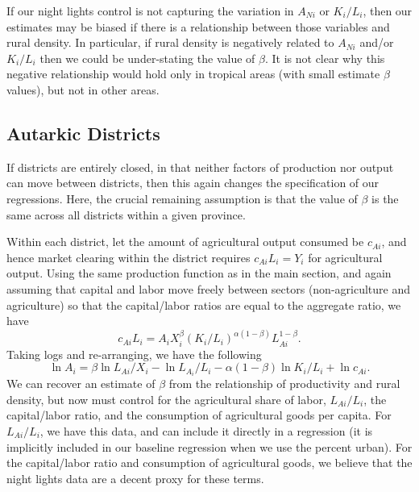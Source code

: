 \documentclass[11pt]{article}
\begin{document}
If our night lights control is not capturing the variation in $A_{Ni}$ or $K_i/L_i$, then our estimates may be biased if there is a relationship between those variables and rural density. In particular, if rural density is negatively related to $A_{Ni}$ and/or $K_i/L_i$ then we could be under-stating the value of $\beta$. It is not clear why this negative relationship would hold only in tropical areas (with small estimate $\beta$ values), but not in other areas.

\subsection{Autarkic Districts}
If districts are entirely closed, in that neither factors of production nor output can move between districts, then this again changes the specification of our regressions. Here, the crucial remaining assumption is that the value of $\beta$ is the same across all districts within a given province. 

Within each district, let the amount of agricultural output consumed be $c_{Ai}$, and hence market clearing within the district requires $c_{Ai} L_i = Y_i$ for agricultural output. Using the same production function as in the main section, and again assuming that capital and labor move freely between sectors (non-agriculture and agriculture) so that the capital/labor ratios are equal to the aggregate ratio, we have
\begin{equation}
	c_{Ai} L_i = A_i X_i^{\beta} \left(K_i/L_i\right)^{\alpha(1-\beta)} L_{Ai}^{1-\beta}. \nonumber
\end{equation}
Taking logs and re-arranging, we have the following
\begin{equation}
	\ln A_i = \beta \ln L_{Ai}/X_i - \ln L_{A_i}/L_i - \alpha(1-\beta) \ln K_{i}/L_{i} + \ln c_{Ai}. \nonumber
\end{equation}
We can recover an estimate of $\beta$ from the relationship of productivity and rural density, but now must control for the agricultural share of labor, $L_{Ai}/L_i$, the capital/labor ratio, and the consumption of agricultural goods per capita. For $L_{Ai}/L_i$, we have this data, and can include it directly in a regression (it is implicitly included in our baseline regression when we use the percent urban). For the capital/labor ratio and consumption of agricultural goods, we believe that the night lights data are a decent proxy for these terms.
\end{document}
